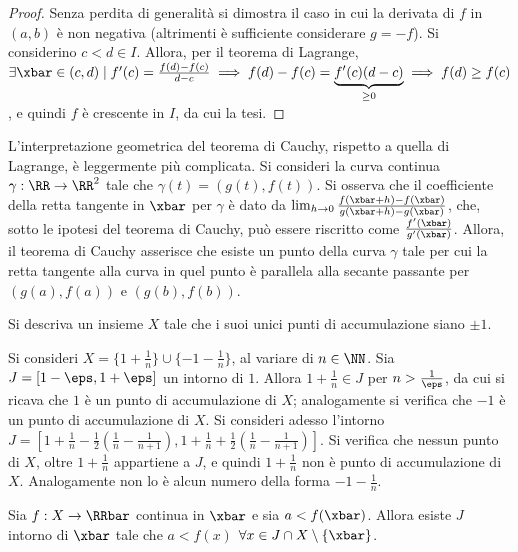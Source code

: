 \documentclass[11pt]{article}
\begin{document}
	\begin{proof}
		Senza perdita di generalità si dimostra il caso in cui la derivata
		di $f$ in $(a, b)$ è non negativa (altrimenti è sufficiente considerare
		$g = -f$).
		Si considerino $c < d \in I$. Allora, per il teorema di Lagrange,
		$\exists \xbar \in (c, d) \mid f'(c) = \frac{f(d) - f(c)}{d-c}
		\implies f(d) - f(c) = \underbrace{f'(c) (d-c)}_{\geq 0} \implies
		f(d) \geq f(c)$, e quindi $f$ è crescente in $I$, da cui la tesi.
	\end{proof}

	\begin{remark}\nl
		\li L'interpretazione geometrica del teorema di Cauchy, rispetto
		a quella di Lagrange, è leggermente più complicata. Si consideri
		la curva continua $\gamma : \RR \to \RR^2$ tale che
		$\gamma(t) =(g(t), f(t))$. Si osserva che il coefficiente della
		retta tangente in $\xbar$ per $\gamma$ è dato da $\lim_{h \to 0} \frac{f(\xbar + h) - f(\xbar)}{g(\xbar + h) - g(\xbar)}$, che,
		sotto le ipotesi del teorema di Cauchy, può essere riscritto
		come $\frac{f'(\xbar)}{g'(\xbar)}$. Allora, il teorema di Cauchy
		asserisce che esiste un punto della curva $\gamma$ tale per cui
		la retta tangente alla curva in quel punto è parallela alla secante
		passante per $(g(a), f(a))$ e $(g(b), f(b))$.
	\end{remark}

	\begin{exercise}
		Si descriva un insieme $X$ tale che i suoi unici punti di accumulazione
		siano $\pm 1$.
	\end{exercise}

	\begin{solution}
		Si consideri $X = \{1 + \frac{1}{n}\} \cup \{-1 - \frac{1}{n}\}$, al variare di $n \in \NN$. Sia
		$J = [1 - \eps, 1 + \eps]$ un intorno di $1$. Allora $1 + \frac{1}{n} \in J$ per $n > \frac{1}{\eps}$,
		da cui si ricava che $1$ è un punto di accumulazione di $X$; analogamente si verifica che $-1$ è
		un punto di accumulazione di $X$. Si consideri adesso l'intorno $J = \left[1 + \frac{1}{n} - \frac{1}{2} \left( \frac{1}{n} - \frac{1}{n+1} \right), 1 + \frac{1}{n} + \frac{1}{2} \left( \frac{1}{n} - \frac{1}{n+1} \right) \right]$. Si verifica che nessun punto di $X$, oltre $1 + \frac{1}{n}$ appartiene a $J$, e quindi
		$1 + \frac{1}{n}$ non è punto di accumulazione di $X$. Analogamente non lo è alcun numero della forma
		$-1 - \frac{1}{n}$.
	\end{solution}

	\begin{exercise}
		Sia $f : X \to \RRbar$ continua in $\xbar$ e sia $a < f(\xbar)$.
		Allora esiste $J$ intorno di $\xbar$ tale che $a < f(x)$ $\forall
		x \in J \cap X \setminus \{\xbar\}$.
	\end{exercise}
\end{document}
